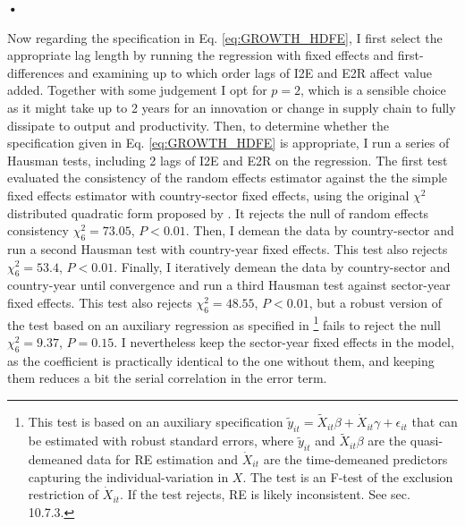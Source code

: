 \textbf{\textbf{•}}\documentclass[a4paper]{article}
\begin{document}
Now regarding the specification in Eq. \ref{eq:GROWTH_HDFE}, I first select the appropriate lag length by running the regression with fixed effects and first-differences and examining up to which order lags of I2E and E2R affect value added. Together with some judgement I opt for $p = 2$, which is a sensible choice as it might take up to 2 years for an innovation or change in supply chain to fully dissipate to output and productivity. Then, to determine whether the specification given in Eq. \ref{eq:GROWTH_HDFE} is appropriate, I run a series of Hausman tests, including 2 lags of I2E and E2R on the regression. The first test evaluated the consistency of the random effects estimator against the the  simple fixed effects estimator with country-sector fixed effects, using the original $\chi^2$ distributed quadratic form proposed by \citet{hausman1978specification}. It rejects the null of random effects consistency $\chi^2_6 = 73.05$, $P < 0.01$. Then, I demean the data by country-sector and run a second Hausman test with country-year fixed effects. This test also rejects $\chi^2_6 = 53.4$, $P < 0.01$. Finally, I iteratively demean the data by country-sector and country-year until convergence and run a third Hausman test against sector-year fixed effects. This test also rejects $\chi^2_6 = 48.55$, $P < 0.01$, but a robust version of the test based on an auxiliary regression as specified in \citet{wooldridge2010econometric}\footnote{This test is based on an auxiliary specification $\tilde{y}_{it} = \tilde{X}_{it}\beta + \dot{X}_{it}\gamma + \epsilon_{it}$ that can be estimated with robust standard errors, where  $\tilde{y}_{it} $ and $\tilde{X}_{it}\beta$ are the quasi-demeaned data for RE estimation and $\dot{X}_{it}$ are the time-demeaned predictors capturing the individual-variation in $X$. The test is an F-test of the exclusion restriction of $\dot{X}_{it}$. If the test rejects, RE is likely inconsistent. See \citet{wooldridge2010econometric} sec. 10.7.3.} fails to reject the null $\chi^2_6 = 9.37$, $P = 0.15$. I nevertheless keep the sector-year fixed effects in the model, as the coefficient is practically identical to the one without them, and keeping them reduces a bit the serial correlation in the error term. \newline
\end{document}

